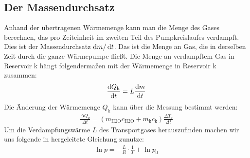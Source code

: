 \subsection{Der Massendurchsatz \cite[vgl.][]{man:v206}}
Anhand der übertragenen Wärmemenge kann man die Menge des Gases berechnen, das pro Zeiteinheit
im zweiten Teil des Pumpkreislaufes verdampft.
Dies ist der Massendurchsatz $\mathop{}\!\mathrm{d} m/ \mathop{}\!\mathrm{d} t$.
Das ist die Menge an Gas, die in derselben Zeit durch die ganze Wärmepumpe fließt.
Die Menge an verdampftem Gas in Reservoir k hängt folgendermaßen mit der Wärmemenge in Reservoir k zusammen:
\begin{align}
    \frac{\mathop{}\!\mathrm{d} Q_\text{k}}{\mathop{}\!\mathrm{d} t} = L \frac{\mathop{}\!\mathrm{d} m}{\mathop{}\!\mathrm{d} t}
    \label{eq:massedurchsatz}
\end{align} 
Die Änderung der Wärmemenge $ Q_\text{k}$ kann über die Messung bestimmt werden:
\begin{align}
    \frac{\Delta Q_\text{k}}{\Delta t} = (m_\text{H2O} c_{\text{H2O}} + m_\text{k} c_\text{k}) \frac{\Delta T_\text{k}}{\Delta t}
    \label{eq:aenderung_q2}
\end{align} 
Um die Verdampfungswärme $L$ des Transportgases herauszufinden machen wir uns folgende in \cite[][5]{man:v203} hergeleitete
Gleichung zunutze:
\begin{align}
    \ln{p} = -\frac{L}{R}\cdot \frac{1}{T} + \ln{p_0}
    \label{eq:Dampfdruckkurve}
\end{align}